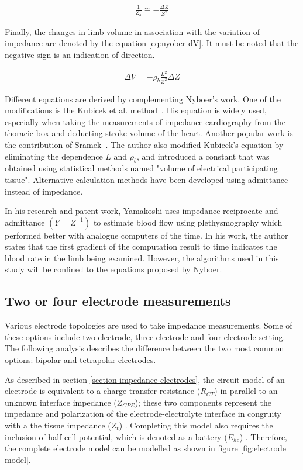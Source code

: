 \begin{align}
	\label{eq:parallel model2}
	\frac{1}{Z_b}\cong -\frac{\Delta Z}{Z^2}
\end{align}

Finally, the changes in limb volume in association with the variation of impedance are denoted by the equation \ref{eq:nyober dV}. It must be noted that the negative sign is an indication of direction.

\begin{align}
	\label{eq:nyober dV}
	\Delta V = -\rho_b \frac{L^2}{Z^2}\Delta Z
\end{align}

Different equations are derived by complementing Nyboer's work. One of the modifications is the Kubicek et al. method~\cite{karnegis1966development, kubicek1970impedance, kubicek1979impedance}. His equation is widely used, especially when taking the measurements of impedance cardiography from the thoracic box and deducting stroke volume of the heart. Another popular work is the contribution  of Sramek~\cite{sramek1986bomed}. The author also modified Kubicek's equation by eliminating the dependence $L$ and $\rho_b$,  and introduced a constant that was obtained using statistical methods named "volume of electrical participating tissue". Alternative calculation methods have been developed using admittance instead of impedance.

In his research and patent work, Yamakoshi \cite{yamakoshi1980limb, shimazu1982evaluation, yamakoshi1978admittance} uses impedance reciprocate and admittance $(Y=Z^{-1})$ to estimate blood flow using plethysmography which performed better with analogue computers of the time. In his work, the author states that the first gradient of the computation result to time indicates the blood rate in the limb being examined. However, the algorithms used in this study will be confined to the equations proposed by Nyboer.

\subsection{Two or four electrode measurements}
\label{section iPG electrodes}
Various electrode topologies are used to take impedance measurements. Some of these options include two-electrode, three electrode and four electrode setting. The following analysis describes the difference between the two most common options: bipolar and tetrapolar electrodes.

As described in section \ref{section impedance electrodes}, the circuit model of an electrode is equivalent to a charge transfer resistance ($R_{CT}$) in parallel to an unknown interface impedance ($Z_{CPE}$); these two components represent the impedance and polarization of the electrode-electrolyte interface \cite{neuman2000biomedical} in congruity with a the tissue impedance ($Z_t$) \cite{lvovich2012impedance}. Completing this model also requires the inclusion of half-cell potential, which is denoted as a battery ($E_{hc}$) \cite{neuman2000biomedical}. Therefore, the complete electrode model can be modelled as shown in figure \ref{fig:electrode model}.

